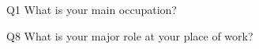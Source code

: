 \begin{description}%
\item{Q1} What is your main occupation?%
\item{Q8} What is your major role at your place of work?%
\end{description}%
